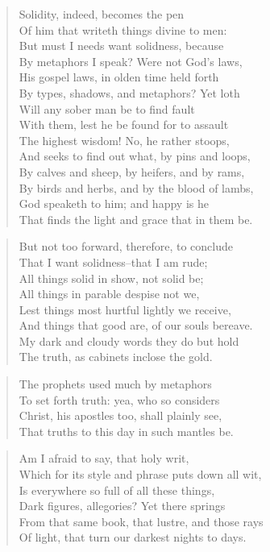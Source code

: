 \begin{verse}
Solidity, indeed, becomes the pen\\
Of him that writeth things divine to men:\\
But must I needs want solidness, because\\
By metaphors I speak? Were not God's laws,\\
His gospel laws, in olden time held forth\\
By types, shadows, and metaphors? Yet loth\\
Will any sober man be to find fault\\
With them, lest he be found for to assault\\
The highest wisdom! No, he rather stoops,\\
And seeks to find out what, by pins and loops,\\
By calves and sheep, by heifers, and by rams,\\
By birds and herbs, and by the blood of lambs,\\
God speaketh to him; and happy is he\\
That finds the light and grace that in them be.\\
\end{verse}
\begin{verse}
But not too forward, therefore, to conclude\\
That I want solidness--that I am rude;\\
All things solid in show, not solid be;\\
All things in parable despise not we,\\
Lest things most hurtful lightly we receive,\\
And things that good are, of our souls bereave.\\
My dark and cloudy words they do but hold\\
The truth, as cabinets inclose the gold.\\
\end{verse}
\begin{verse}
The prophets used much by metaphors\\
To set forth truth: yea, who so considers\\
Christ, his apostles too, shall plainly see,\\
That truths to this day in such mantles be.\\
\end{verse}
\begin{verse}
Am I afraid to say, that holy writ,\\
Which for its style and phrase puts down all wit,\\
Is everywhere so full of all these things,\\
Dark figures, allegories? Yet there springs\\
From that same book, that lustre, and those rays\\
Of light, that turn our darkest nights to days.\\
\end{verse}
